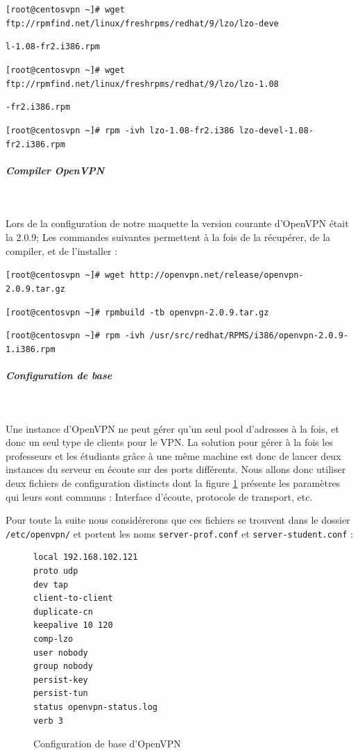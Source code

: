 \verb|[root@centosvpn ~]# wget ftp://rpmfind.net/linux/freshrpms/redhat/9/lzo/lzo-deve|

\verb|l-1.08-fr2.i386.rpm|

\verb|[root@centosvpn ~]# wget ftp://rpmfind.net/linux/freshrpms/redhat/9/lzo/lzo-1.08|

\verb|-fr2.i386.rpm|

\verb|[root@centosvpn ~]# rpm -ivh lzo-1.08-fr2.i386 lzo-devel-1.08-fr2.i386.rpm|

\subparagraph{Compiler OpenVPN}
~

Lors de la configuration de notre maquette la version courante d'OpenVPN était la 2.0.9; Les commandes suivantes permettent à la fois de la récupérer, de la compiler, et de l'installer :

\verb|[root@centosvpn ~]# wget http://openvpn.net/release/openvpn-2.0.9.tar.gz|

\verb|[root@centosvpn ~]# rpmbuild -tb openvpn-2.0.9.tar.gz|

\verb|[root@centosvpn ~]# rpm -ivh /usr/src/redhat/RPMS/i386/openvpn-2.0.9-1.i386.rpm|

\subparagraph{Configuration de base}
~

Une instance d'OpenVPN ne peut gérer qu'un seul pool d'adresses à la fois, et donc un seul type de clients pour le VPN. La solution pour gérer à la fois les professeurs et les étudiants grâce à une même machine est donc de lancer deux instances du serveur en écoute sur des ports différents. Nous allons donc utiliser deux fichiers de configuration distincts dont la figure \ref{configuration_base_openvpn} présente les paramètres qui leurs sont communs : Interface d'écoute, protocole de transport, etc.

Pour toute la suite nous considérerons que ces fichiers se trouvent dans le dossier \texttt{/etc/openvpn/} et portent les noms \texttt{server-prof.conf} et \texttt{server-student.conf} :

\begin{figure}[H]
	\begin{center}
		\begin{minipage}{0.90\textwidth}
			\begin{lstlisting}[frame=trBL]
local 192.168.102.121
proto udp
dev tap
client-to-client
duplicate-cn
keepalive 10 120
comp-lzo
user nobody
group nobody
persist-key
persist-tun
status openvpn-status.log
verb 3
			\end{lstlisting}
		\end{minipage}
	\end{center}
	\caption{Configuration de base d'OpenVPN}
	\label{configuration_base_openvpn}
\end{figure}

